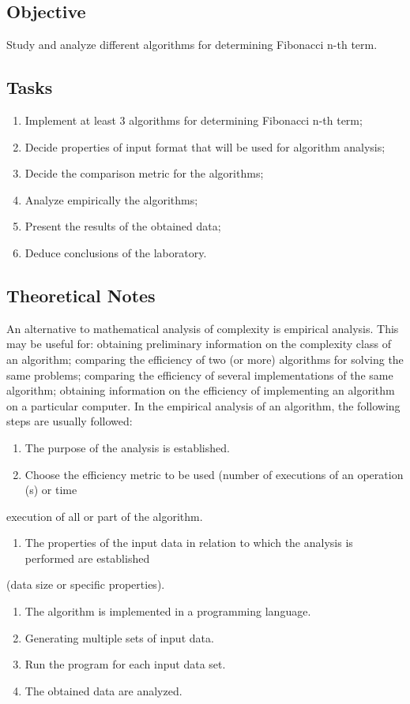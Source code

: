 \documentclass[a4paper,12pt]{article}
\begin{document}
\subsection{Objective}
\label{sec:orgc251725}
Study and analyze different algorithms for determining Fibonacci n-th term.
\subsection{Tasks}
\label{sec:orgffadf90}
\begin{enumerate}
\item Implement at least 3 algorithms for determining Fibonacci n-th term;
\item Decide properties of input format that will be used for algorithm analysis;
\item Decide the comparison metric for the algorithms;
\item Analyze empirically the algorithms;
\item Present the results of the obtained data;
\item Deduce conclusions of the laboratory.
\end{enumerate}
\subsection{Theoretical Notes}
\label{sec:org46ae3ef}
An alternative to mathematical analysis of complexity is empirical analysis.
This may be useful for: obtaining preliminary information on the complexity class of an
algorithm; comparing the efficiency of two (or more) algorithms for solving the same problems;
comparing the efficiency of several implementations of the same algorithm; obtaining information on the
efficiency of implementing an algorithm on a particular computer.
In the empirical analysis of an algorithm, the following steps are usually followed:
\begin{enumerate}
\item The purpose of the analysis is established.
\item Choose the efficiency metric to be used (number of executions of an operation (s) or time
\end{enumerate}
execution of all or part of the algorithm.
\begin{enumerate}
\item The properties of the input data in relation to which the analysis is performed are established
\end{enumerate}
(data size or specific properties).
\begin{enumerate}
\item The algorithm is implemented in a programming language.
\item Generating multiple sets of input data.
\item Run the program for each input data set.
\item The obtained data are analyzed.
\end{enumerate}
\end{document}
